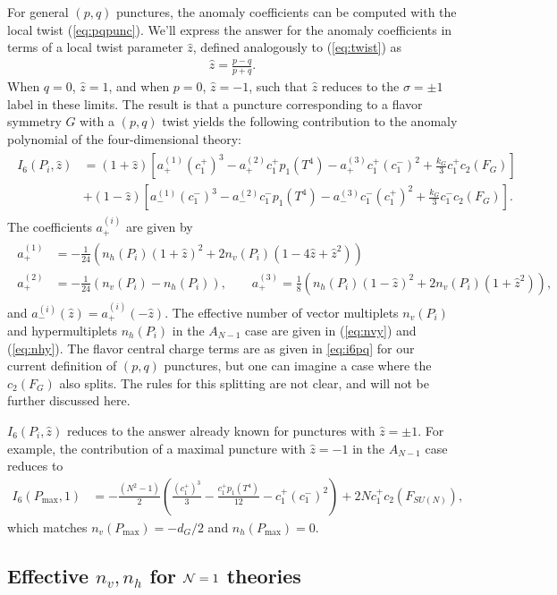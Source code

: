 \documentclass[a4paper,11pt]{article}
\newcommand{\ba}[1]{\begin{align} #1 \end{align} }
\newcommand{\bs}[1]{\begin{split} #1 \end{split} }
\def\CN{{\cal N}}
\begin{document}
For general $(p,q)$ punctures, the anomaly coefficients can be computed with the local twist (\ref{eq:pqpunc}). We'll express the answer for the anomaly coefficients in terms of a local twist parameter $\hat{z}$, defined analogously to (\ref{eq:twist}) as
	\ba{
	\hat{z}=\frac{p-q}{p+q}.\label{eq:twist2}
	}
When $q=0$, $\hat{z}=1$, and when $p=0$, $\hat{z}=-1$, such that $\hat{z}$ reduces to the $\sigma=\pm 1$ label in these limits. The result is that a puncture corresponding to a flavor symmetry $G$ with a $(p,q)$ twist yields the following contribution to the anomaly polynomial of the four-dimensional theory:
	\ba{\bs{
	I_6(P_i,\hat{z}) &= (1+\hat{z}) \left[ {a_+^{(1)}} {\left(c_1^+\right)^3} - {a_+^{(2)}}{c_1^+p_1(T^4)} - {a_+^{(3)}} {c_1^+ \left(c_1^-\right)^2}+ \frac{k_G}{3} c_1^+c_2(F_G) \right]\\
	&+(1-\hat{z})\left[ a_-^{(1)} {\left(c_1^-\right)^3} - a_-^{(2)} {c_1^-p_1(T^4)} -a_-^{(3)} {c_1^-\left(c_1^+\right)^2} + \frac{k_G}{3} c_1^-c_2(F_G) \right].
	}\label{eq:i6pq}}
The coefficients $a_+^{(i)}$ are given by
	\ba{\bs{
	a_+^{(1)} &= -\frac{1}{24} \left( n_h(P_i)(1+\hat{z})^2 + 2 n_v(P_i) (1-4\hat{z}+\hat{z}^2) \right) \\
	a_+^{(2)} &=-\frac{1}{24} (n_v(P_i)-n_h(P_i)),\qquad a_+^{(3)} =\frac{1}{8} \left( n_h(P_i)(1-\hat{z})^2 + 2n_v(P_i)(1+\hat{z}^2) \right),
	}}
and $a_-^{(i)}(\hat{z})=a_+^{(i)}(-\hat{z})$. The effective number of vector multiplets $n_v(P_i)$ and hypermultiplets $n_h(P_i)$ in the $A_{N-1}$ case are given in (\ref{eq:nvy}) and (\ref{eq:nhy}). The flavor central charge terms are as given in \eqref{eq:i6pq} for our current definition of $(p,q)$ punctures, but one can imagine a case where the $c_2(F_G)$ also splits. The rules for this splitting are not clear, and will not be further discussed here.

$I_6(P_i,\hat{z})$ reduces to the answer already known for punctures with $\hat{z}=\pm 1$. For example, the contribution of a maximal puncture with $\hat{z}=-1$ in the $A_{N -1}$ case reduces to
	\ba{
	I_6(P_{\text{max}},1)&= -\frac{(N^2-1)}{2} \left( \frac{\left(c_1^+\right)^3}{3} - \frac{c_1^+p_1(T^4)}{12} - c_1^+\left(c_1^-\right)^2\right) + 2 Nc_1^+c_2(F_{SU(N)}),
	}
	which matches $n_v(P_{\text{max}})=-d_G/2$ and $n_h(P_{\text{max}})=0$.  
	
	

\subsection{Effective $n_v,n_h$ for $\CN=1$ theories}%
\label{sec:effective}
\end{document}
